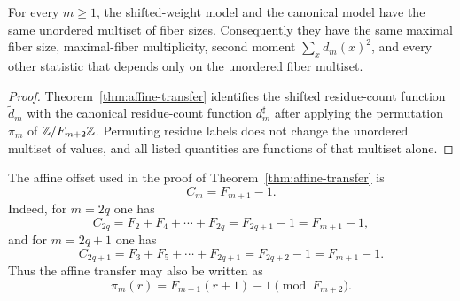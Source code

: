 \begin{corollary}\label{cor:affine-transfer-stats}
For every $m\ge1$, the shifted-weight model and the canonical model have the
same unordered multiset of fiber sizes.  Consequently they have the same
maximal fiber size, maximal-fiber multiplicity, second moment
$\sum_xd_m(x)^2$, and every other statistic that depends only on the unordered
fiber multiset.
\end{corollary}

\begin{proof}
Theorem~\ref{thm:affine-transfer} identifies the shifted residue-count
function $\widetilde d_m$ with the canonical residue-count function
$d_m^\sharp$ after applying the permutation $\pi_m$ of
$\mathbb{Z}/F_{m+2}\mathbb{Z}$.  Permuting residue labels does not change the unordered
multiset of values, and all listed quantities are functions of that multiset
alone.
\end{proof}

\begin{remark}
The affine offset used in the proof of Theorem~\ref{thm:affine-transfer} is
\[
C_m=F_{m+1}-1.
\]
Indeed, for $m=2q$ one has
\[
C_{2q}=F_2+F_4+\cdots+F_{2q}=F_{2q+1}-1=F_{m+1}-1,
\]
and for $m=2q+1$ one has
\[
C_{2q+1}=F_3+F_5+\cdots+F_{2q+1}=F_{2q+2}-1=F_{m+1}-1.
\]
Thus the affine transfer may also be written as
\[
\pi_m(r)=F_{m+1}(r+1)-1 \pmod{F_{m+2}}.
\]
\end{remark}
\fi
